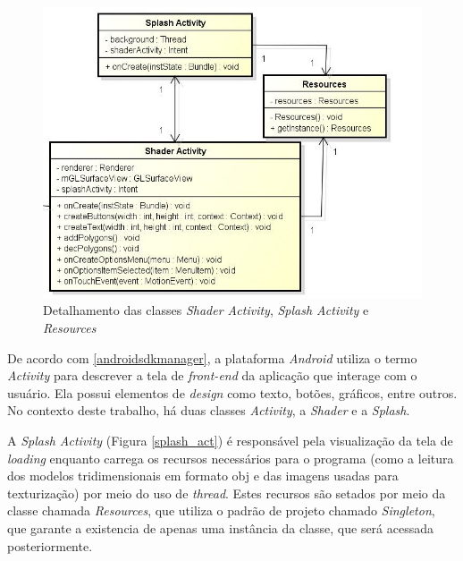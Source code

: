 	\begin{figure}[h]
	\centering
		\includegraphics[keepaspectratio=true,scale=0.6]{figuras/shader_splash.jpg}
	\caption{Detalhamento das classes \textit{Shader Activity}, \textit{Splash Activity} e \textit{Resources}}
	\label{shader_splash}
	\end{figure}

	De acordo com \ref{androidsdkmanager}, a plataforma \textit{Android} utiliza o termo \textit{Activity} para descrever a tela de \textit{front-end} da aplicação que interage com o usuário. Ela possui elementos de \textit{design} como texto, botões, gráficos, entre outros. No contexto deste trabalho, há duas classes \textit{Activity}, a \textit{Shader} e a \textit{Splash}. 

	A \textit{Splash Activity} (Figura  \ref{splash_act}) é responsável pela visualização da tela de \textit{loading} enquanto carrega os recursos necessários para o programa (como a leitura dos modelos tridimensionais em formato obj e das imagens usadas para texturização) por meio do uso de \textit{thread}. Estes recursos são setados por meio da classe chamada \textit{Resources}, que utiliza o padrão de projeto chamado \textit{Singleton}, que garante a existencia de apenas uma instância da classe, que será acessada posteriormente.

